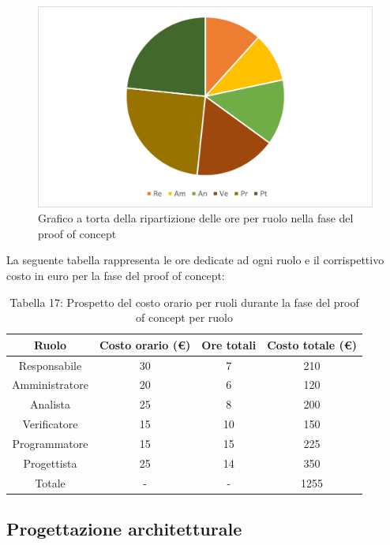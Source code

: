 \begin{figure}[H]
    \centering
    \includegraphics[scale=0.6]{img/grafi preventivo/torta/proof/complessivo.png}
    \caption{Grafico a torta della ripartizione delle ore per ruolo nella fase del proof of concept}
\end{figure}
La seguente tabella rappresenta le ore dedicate ad ogni ruolo e il corrispettivo costo in euro per la fase del proof of concept:
\begin{table}[h]
	\setlength\extrarowheight{5pt}
	\centering
	\begin{tabularx}{\textwidth}{|ccc|c|}
		\hline
		\rowcolor{white}
		\textbf{Ruolo} & \textbf{Costo orario (€)} & \textbf{Ore totali} & \textbf{Costo totale (€)} \\
		\hline
		Responsabile &30&7&210 \\
		Amministratore &20&6&120 \\
		Analista &25&8&200 \\
		Verificatore &15&10&150 \\
		Programmatore &15&15&225 \\
		Progettista &25&14&350 \\
		\hline
		Totale &-&-&1255 \\
		\hline
	\end{tabularx}
    \vspace{10pt}
	\caption{Tabella 17: Prospetto del costo orario per ruoli durante la fase del proof of concept per ruolo}
\end{table}
%
\subsection{Progettazione architetturale}

